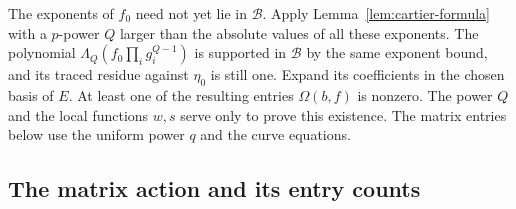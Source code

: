The exponents of $f_0$ need not yet lie in $\mathcal B$. Apply
Lemma~\ref{lem:cartier-formula} with a $p$-power $Q$ larger than
the absolute values of all these exponents. The polynomial
$\Lambda_Q(f_0\prod_i g_i^{Q-1})$ is supported in $\mathcal B$ by the
same exponent bound, and its traced residue against $\eta_0$ is still
one. Expand its coefficients in the chosen basis of $E$. At least
one of the resulting entries $\Omega(b,f)$ is nonzero. The power $Q$
and the local functions $w,s$ serve only to prove this existence.
The matrix entries below use the uniform power $q$ and the curve equations.

\subsection{The matrix action and its entry counts}

